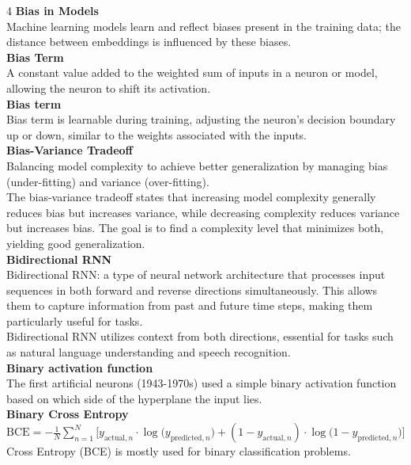 \documentclass[8pt]{extarticle}
\begin{document}
\begin{multicols}{4}
\vspace{2pt}\textbf{Bias in Models}\\
Machine learning models learn and reflect biases present in the training data; the distance between embeddings is influenced by these biases.\\
\vspace{2pt}\textbf{Bias Term}\\
A constant value added to the weighted sum of inputs in a neuron or model, allowing the neuron to shift its activation.\\
\vspace{2pt}\textbf{Bias term}\\
Bias term is learnable during training, adjusting the neuron's decision boundary up or down, similar to the weights associated with the inputs.\\
\vspace{2pt}\textbf{Bias-Variance Tradeoff}\\
Balancing model complexity to achieve better generalization by managing bias (under-fitting) and variance (over-fitting).\\
The bias-variance tradeoff states that increasing model complexity generally reduces bias but increases variance, while decreasing complexity reduces variance but increases bias. The goal is to find a complexity level that minimizes both, yielding good generalization.\\
\vspace{2pt}\textbf{Bidirectional RNN}\\
Bidirectional RNN: a type of neural network architecture that processes input sequences in both forward and reverse directions simultaneously. This allows them to capture information from past and future time steps, making them particularly useful for tasks.\\
Bidirectional RNN utilizes context from both directions, essential for tasks such as natural language understanding and speech recognition.\\
\vspace{2pt}\textbf{Binary activation function}\\
The first artificial neurons (1943-1970s) used a simple binary activation function based on which side of the hyperplane the input lies.\\
\vspace{2pt}\textbf{Binary Cross Entropy}\\
$ \text{BCE} = -\frac{1}{N}\sum_{n=1}^{N}\big[ y_{\text{actual},n}\cdot\log\big(y_{\text{predicted},n}\big) + (1 - y_{\text{actual},n})\cdot\log\big(1 - y_{\text{predicted},n}\big) \big] $\Binary Cross Entropy (BCE) is mostly used for binary classification problems.\\

\end{multicols}
\end{document}
